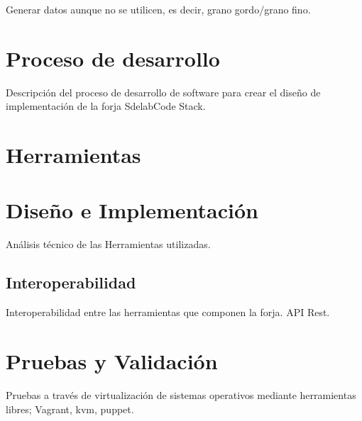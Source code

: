 \documentclass[11pt]{scrartcl}
\begin{document}
\par Generar datos aunque no se utilicen, es decir, grano gordo/grano fino.


\section{Proceso de desarrollo}
\label{sec:procesodesarrollo}

\par Descripci\'on del proceso de desarrollo de software para crear el diseño de implementaci\'on de la forja SdelabCode Stack.

\section{Herramientas}
\label{sec:herramientas}



\section{Dise\~no e Implementaci\'on}
\label{sec:diseno}

\par Análisis técnico de las Herramientas utilizadas.


\subsection{Interoperabilidad}
\label{sub:interoperabilidad}

\par Interoperabilidad entre las herramientas que componen la forja. API Rest.



\section{Pruebas y Validaci\'on}
\label{sec:pruebas}

\par Pruebas a través de virtualizaci\'on de sistemas operativos mediante herramientas libres; Vagrant, kvm, puppet.

\end{document}
